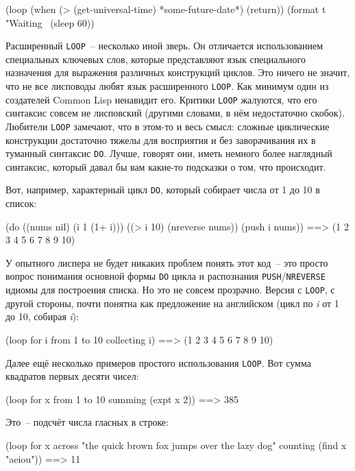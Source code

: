 \begin{myverb}
(loop
  (when (> (get-universal-time) *some-future-date*)
    (return))
  (format t "Waiting~%
  (sleep 60))
\end{myverb}

Расширенный \lstinline{LOOP}~-- несколько иной зверь. Он отличается использованием спе\-циаль\-ных
ключевых слов, которые представляют язык специального назначения для выражения различных
конструкций циклов. Это ничего не значит, что не все лисповоды любят язык расширенного
\lstinline{LOOP}. Как минимум один из создателей Common Lisp ненавидит его. Критики
\lstinline{LOOP} жалуются, что его синтаксис совсем не лисповский (другими словами, в нём
недостаточно скобок). Любители \lstinline{LOOP} замечают, что в этом-то и весь смысл: сложные
циклические конструкции достаточно тяжелы для восприятия и без заворачивания их в туманный
синтаксис \lstinline{DO}. Лучше, говорят они, иметь немного более наглядный синтаксис, который
давал бы вам какие-то подсказки о том, что происходит.

Вот, например, характерный цикл \lstinline{DO}, который собирает числа от 1 до 10 в список:

\begin{myverb}
(do ((nums nil) (i 1 (1+ i)))
    ((> i 10) (nreverse nums))
  (push i nums)) ==> (1 2 3 4 5 6 7 8 9 10)
\end{myverb}

У опытного лиспера не будет никаких проблем понять этот код~-- это просто вопрос
понимания основной формы \lstinline{DO} цикла и распознания \lstinline{PUSH}/\lstinline{NREVERSE} идиомы
для построения списка. Но это не совсем прозрачно. Версия с \lstinline{LOOP}, с другой стороны,
почти понятна как предложение на английском (цикл по \textit{i} от 1 до 10, собирая
\textit{i}):

\begin{myverb}
(loop for i from 1 to 10 collecting i) ==> (1 2 3 4 5 6 7 8 9 10)
\end{myverb}

Далее ещё несколько примеров простого использования \lstinline{LOOP}. Вот сумма квадратов
первых десяти чисел:

\begin{myverb}
(loop for x from 1 to 10 summing (expt x 2)) ==> 385
\end{myverb}

Это~-- подсчёт числа гласных в строке:

\begin{myverb}
(loop for x across "the quick brown fox jumps over the lazy dog"
      counting (find x "aeiou")) ==> 11
\end{myverb}

